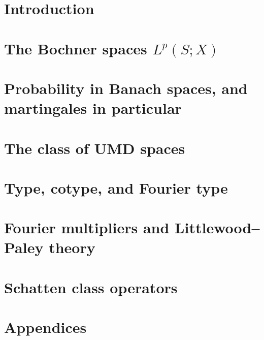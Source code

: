 \documentclass[a4paper,10pt,intlimits,sumlimits]{amsart}
\begin{document}


\maketitle
\footnotesize
\tableofcontents
\normalsize

\section{Introduction}
\label{sec:intro}


\section{The Bochner spaces \texorpdfstring{$L^p(S;X)$}{Lp(S;X)}}
\label{sec:Bochner-spaces}


\section{Probability in Banach spaces, and martingales in particular}
\label{sec:martingales} 


\section{The class of UMD spaces}
\label{sec:UMD}


\section{Type, cotype, and Fourier type}
\label{sec:type}


\section{Fourier multipliers and Littlewood--Paley theory}
\label{sec:HT}


\section{Schatten class operators}
\label{sec:schatten}


\section{Appendices}
\label{sec:appendices}





\printbibliography

% 
%  
\end{document}
